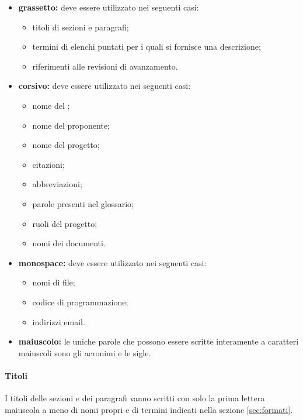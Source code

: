                 \begin{itemize}
                    \item \textbf{grassetto:} deve essere utilizzato nei seguenti casi:
                        \begin{itemize}
                            \item titoli di sezioni e paragrafi;
                            \item termini di elenchi puntati per i quali si fornisce una descrizione;
                            \item riferimenti alle revisioni di avanzamento.
                        \end{itemize}
                    \item \textbf{corsivo:} deve essere utilizzato nei seguenti casi:
                        \begin{itemize}
                            \item nome del ;
                            \item nome del proponente;
                            \item nome del progetto;
                            \item citazioni;
                            \item abbreviazioni;
                            \item parole presenti nel glossario;
                            \item ruoli del progetto;
                            \item nomi dei documenti.
                        \end{itemize}
                    \item \textbf{monospace:} deve essere utilizzato nei seguenti casi:
                        \begin{itemize}
                            \item nomi di file;
                            \item codice di programmazione;
                            \item indirizzi email.
                        \end{itemize}
                    \item \textbf{maiuscolo:} le uniche parole che possono essere scritte interamente a caratteri maiuscoli sono gli acronimi e le sigle.
                \end{itemize}
                \paragraph{Titoli}
                I titoli delle sezioni e dei paragrafi vanno scritti con solo la prima lettera maiuscola a meno di nomi propri e di termini indicati nella sezione \ref{sec:formati}.

